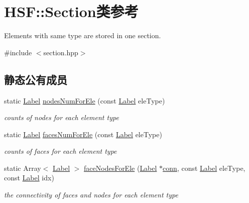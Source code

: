 \hypertarget{classHSF_1_1Section}{
\section{HSF::Section类参考}
\label{classHSF_1_1Section}
}


Elements with same type are stored in one section.  


{\ttfamily \#include $<$section.hpp$>$}\subsection*{静态公有成员}
\begin{DoxyCompactItemize}
\item 
static \hyperlink{namespaceHSF_ae65d72be782e989396ebe5ec6ae4c2b6}{Label} \hyperlink{classHSF_1_1Section_a2b8ea34f5ad6bb13a9aba3bb4be70900}{nodesNumForEle} (const \hyperlink{namespaceHSF_ae65d72be782e989396ebe5ec6ae4c2b6}{Label} eleType)
\begin{DoxyCompactList}\small\item\em counts of nodes for each element type \item\end{DoxyCompactList}\item 
static \hyperlink{namespaceHSF_ae65d72be782e989396ebe5ec6ae4c2b6}{Label} \hyperlink{classHSF_1_1Section_ae863db6a0bd22e6904903c0d1a1ea612}{facesNumForEle} (const \hyperlink{namespaceHSF_ae65d72be782e989396ebe5ec6ae4c2b6}{Label} eleType)
\begin{DoxyCompactList}\small\item\em counts of faces for each element type \item\end{DoxyCompactList}\item 
static Array$<$ \hyperlink{namespaceHSF_ae65d72be782e989396ebe5ec6ae4c2b6}{Label} $>$ \hyperlink{classHSF_1_1Section_a1590d983dafb5374bbbbb3727804b080}{faceNodesForEle} (\hyperlink{namespaceHSF_ae65d72be782e989396ebe5ec6ae4c2b6}{Label} $\ast$\hyperlink{classHSF_1_1Section_a21e40283b7ab3f9a90264724747b18b1}{conn}, const \hyperlink{namespaceHSF_ae65d72be782e989396ebe5ec6ae4c2b6}{Label} eleType, const \hyperlink{namespaceHSF_ae65d72be782e989396ebe5ec6ae4c2b6}{Label} idx)
\begin{DoxyCompactList}\small\item\em the connectivity of faces and nodes for each element type \item\end{DoxyCompactList}\item 

\end{DoxyCompactItemize}
